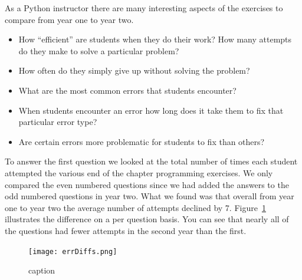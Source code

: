 As a Python instructor there are many interesting aspects of the exercises to compare from year one to year two.  

\begin{itemize}
	\item How ``efficient'' are students when they do their work?  How many attempts do they make to solve a particular problem?
	\item How often do they simply give up without solving the problem?
	\item What are the most common errors that students encounter?
	\item When students encounter an error how long does it take them to fix that particular error type?
	\item Are certain errors more problematic for students to fix than others?
\end{itemize}

To answer the first question we looked at the total number of times each student attempted the various end of the chapter programming exercises.  We only compared the even numbered questions since we had added the answers to the odd numbered questions in year two.  What we found was that overall from year one to year two the average number of attempts declined by 7.  Figure~\ref{fig:attempts} illustrates the difference on a per question basis.  You can see that nearly all of the questions had fewer attempts in the second year than the first.

\begin{figure}[htbp]
	\centering
		\texttt{[image: errDiffs.png]}
	\caption{caption}
	\label{fig:attempts}
\end{figure}



